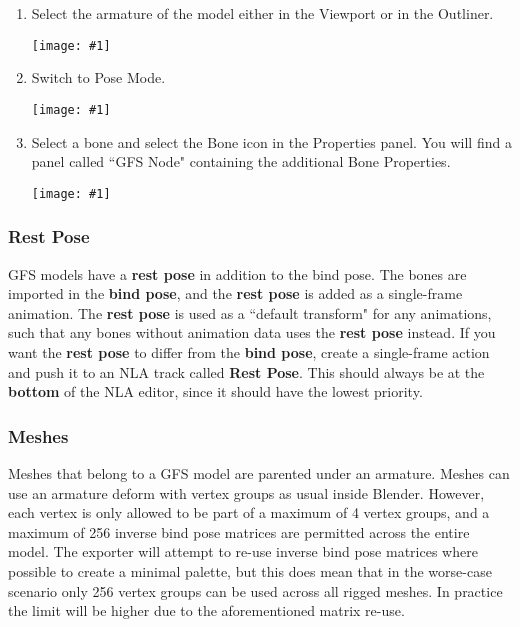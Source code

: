 \documentclass{article}
\newenvironment{guide}[1]
{
	\begin{center}
		\begin{tcolorbox}[%
			colback=black!20, 
			boxrule=0pt, 
			title=Step-by-step: #1,
			enhanced,
			breakable,
			overlay unbroken={%
                \draw[line width=1pt, black, rounded corners]
        	    (frame.north west) rectangle (frame.south east);
			},
    		overlay first={%
        		 \draw[line width=1pt, black, rounded corners]
        	    (frame.south west) -- (frame.north west) -- (frame.north east) -- (frame.south east);
                \draw[line width=1pt, black]
                (frame.south west) -- (frame.south east);
            },
    		overlay middle={%
                \draw[line width=1pt, black]
        	    (frame.north west) rectangle (frame.south east);
        	},
    		overlay last={%
                \draw[line width=1pt, black, rounded corners]
        	    (frame.north west) -- (frame.south west) -- (frame.south east) -- (frame.north east);
                \draw[line width=1pt, black]
                (frame.north west) -- (frame.north east);
           	}
        ]{}
    	\begin{enumerate}
}
{
    		\end{enumerate}
    	\end{tcolorbox}
	\end{center}  	 
}
\newcommand{\guideimage}[1]
{
	\begin{center}
		\texttt{[image: \#1]}
	\end{center}
}
\begin{document}
\begin{guide}{Accessing Extra Bone Properties}
\item Select the armature of the model either in the Viewport or in the Outliner.
\guideimage{images/editing_models/edits_select_armature.png}
\item Switch to Pose Mode.
\guideimage{images/editing_models/edits_to_pose_mode.png}
\item Select a bone and select the Bone icon in the Properties panel. You will find a panel called ``GFS Node" containing the additional Bone Properties.
\guideimage{images/editing_models/edits_bone_properties.png}
\end{guide}
\clearpage

\subsubsection{Rest Pose}
GFS models have a \textbf{rest pose} in addition to the bind pose. The bones are imported in the \textbf{bind pose}, and the \textbf{rest pose} is added as a single-frame animation. The \textbf{rest pose} is used as a ``default transform" for any animations, such that any bones without animation data uses the \textbf{rest pose} instead. If you want the \textbf{rest pose} to differ from the \textbf{bind pose}, create a single-frame action and push it to an NLA track called \textbf{Rest Pose}. This should always be at the \textbf{bottom} of the NLA editor, since it should have the lowest priority.

\subsubsection{Meshes}
Meshes that belong to a GFS model are parented under an armature. Meshes can use an armature deform with vertex groups as usual inside Blender. However, each vertex is only allowed to be part of a maximum of 4 vertex groups, and a maximum of 256 inverse bind pose matrices are permitted across the entire model. The exporter will attempt to re-use inverse bind pose matrices where possible to create a minimal palette, but this does mean that in the worse-case scenario only 256 vertex groups can be used across all rigged meshes. In practice the limit will be higher due to the aforementioned matrix re-use.
\end{document}
